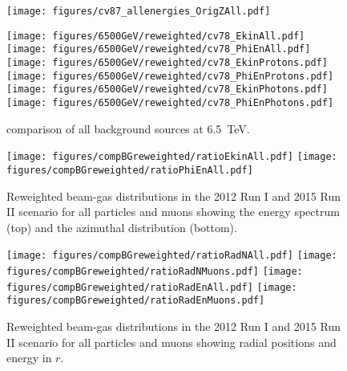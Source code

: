\begin{figure}
\begin{center}
  \texttt{[image: figures/cv87\_allenergies\_OrigZAll.pdf]}
\end{center}
\vspace{-0.6cm}
 \caption{
  \label{fig:OrigZMuonAllEn2}} 
\end{figure}



\begin{figure}
\begin{center}
  \texttt{[image: figures/6500GeV/reweighted/cv78\_EkinAll.pdf]}
  \texttt{[image: figures/6500GeV/reweighted/cv78\_PhiEnAll.pdf]}
  \texttt{[image: figures/6500GeV/reweighted/cv78\_EkinProtons.pdf]}
  \texttt{[image: figures/6500GeV/reweighted/cv78\_PhiEnProtons.pdf]}
 \texttt{[image: figures/6500GeV/reweighted/cv78\_EkinPhotons.pdf]}
 \texttt{[image: figures/6500GeV/reweighted/cv78\_PhiEnPhotons.pdf]}
\end{center}
\vspace{-0.6cm}
 \caption{comparison of all background sources at 6.5~TeV.
  \label{compAllBKG_6.52}}
\end{figure}

\begin{figure}%
\centering
\texttt{[image: figures/compBGreweighted/ratioEkinAll.pdf]}
\texttt{[image: figures/compBGreweighted/ratioPhiEnAll.pdf]}
\caption{Reweighted beam-gas distributions in the 2012 Run I and 2015 Run II scenario for all particles and muons showing the energy spectrum (top) and the azimuthal distribution (bottom).
  \label{fig:compBGreweighted12}}
\end{figure}




\begin{figure}%
\centering
\texttt{[image: figures/compBGreweighted/ratioRadNAll.pdf]}
\texttt{[image: figures/compBGreweighted/ratioRadNMuons.pdf]}
\texttt{[image: figures/compBGreweighted/ratioRadEnAll.pdf]}
\texttt{[image: figures/compBGreweighted/ratioRadEnMuons.pdf]}
\caption{Reweighted beam-gas distributions in the 2012 Run I and 2015 Run II scenario for all particles and muons showing radial positions and energy in $r$.
  \label{fig:compBGreweighted2}}
\end{figure}



